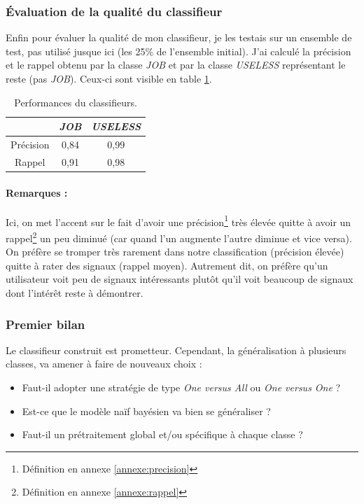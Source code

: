             \subsubsection{Évaluation de la qualité du classifieur}
                Enfin pour évaluer la qualité de mon classifieur, je les testais sur un ensemble de test, pas utilisé jusque ici (les 25\% de l'ensemble initial). J'ai calculé la précision et le rappel obtenu par la classe \textit{JOB} et par la classe \textit{USELESS} représentant le reste (pas \textit{JOB}). Ceux-ci sont visible en table \ref{tab:classif_perf}.
                \begin{table}[h]
                    \centering
                    \begin{tabular}{| c | c | c |}
                        \hline
                         & \textit{JOB} & \textit{USELESS} \\
                        \hline
                        Précision & 0,84 & 0,99 \\
                        Rappel & 0,91 & 0,98 \\
                        \hline
                    \end{tabular}
                    \caption{Performances du classifieurs.}
                    \label{tab:classif_perf}
                \end{table}

            \paragraph{Remarques :}
                Ici, on met l'accent sur le fait d'avoir une précision\footnote{Définition en annexe \ref{annexe:precision}} très élevée quitte à avoir un rappel\footnote{Définition en annexe \ref{annexe:rappel}} un peu diminué (car quand l'un augmente l'autre diminue et vice versa). On préfère se tromper très rarement dans notre classification (précision élevée) quitte à rater des signaux (rappel moyen). Autrement dit, on préfère qu'un utilisateur voit peu de signaux intéressants plutôt qu'il voit beaucoup de signaux dont l'intérêt reste à démontrer.

            \subsubsection{Premier bilan}
                Le classifieur construit est prometteur. Cependant, la généralisation à plusieurs classes, va amener à faire de nouveaux choix :
                \begin{itemize}
                    \item Faut-il adopter une stratégie de type \textit{One versus All} ou \textit{One versus One} ?
                    \item Est-ce que le modèle naïf bayésien va bien se généraliser ?
                    \item Faut-il un prétraitement global et/ou spécifique à chaque classe ?
                \end{itemize}

